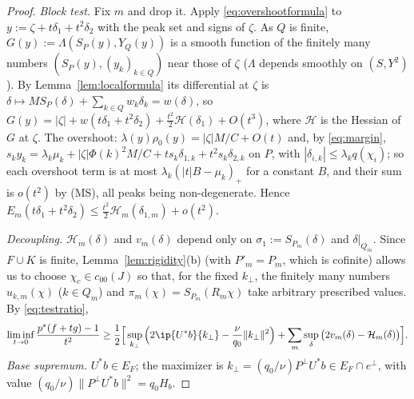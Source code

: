 \begin{proof}
\emph{Block test.}  Fix $m$ and drop it.  Apply \eqref{eq:overshootformula}
to $y:=\zeta+t\delta_1+t^2\delta_2$ with the peak set and signs of $\zeta$.
As $Q$ is finite, $G(y):=\Lambda(S_P(y),Y_Q(y))$ is a smooth function of the
finitely many numbers $(S_P(y),(y_k)_{k\in Q})$ near those of $\zeta$
($\Lambda$ depends smoothly on $(S,Y^2)$).  By Lemma~\ref{lem:localformula}
its differential at $\zeta$ is $\delta\mapsto MS_P(\delta)+\sum_{k\in
Q}w_k\delta_k=w(\delta)$, so
$G(y)=|\zeta|+w(t\delta_1+t^2\delta_2)+\frac{t^2}2\mathcal H(\delta_1)+
O(t^3)$, where $\mathcal H$ is the Hessian of $G$ at $\zeta$.  The overshoot:
$\lambda(y)\rho_0(y)=|\zeta|M/C+O(t)$ and, by \eqref{eq:margin},
$s_ky_k=\lambda_k\mu_k+|\zeta|\Phi(k)^2M/C+ts_k\delta_{1,k}+t^2s_k
\delta_{2,k}$ on $P$, with $|\delta_{i,k}|\le\lambda_kq(\chi_i)$; so each
overshoot term is at most $\lambda_k(|t|B-\mu_k)_+$ for a constant $B$,
and their sum is $o(t^2)$ by (MS), all peaks being non-degenerate.  Hence
$E_m(t\delta_1+t^2\delta_2)\le\frac{t^2}2\mathcal H_m(\delta_{1,m})+o(t^2)$.

\emph{Decoupling.}  $\mathcal H_m(\delta)$ and $v_m(\delta)$ depend only on
$\sigma_1:=S_{P_m}(\delta)$ and $\delta|_{Q_m}$.  Since $F\cup K$ is finite,
Lemma~\ref{lem:rigidity}(b) (with $P'_m=P_m$, which is cofinite) allows us to
choose $\chi_c\in c_{00}(J)$ so that, for the fixed $k_\perp$, the finitely
many numbers $u_{k,m}(\chi)$ ($k\in Q_m$) and $\pi_m(\chi)=S_{P_m}(R_m\chi)$
take arbitrary prescribed values.  By \eqref{eq:testratio},
\[
 \liminf_{t\to0}\frac{p^*(f+tg)-1}{t^2}\ge\frac12\Big[\sup_{k_\perp}
 \Big(2\ip{U^*b}{k_\perp}-\frac{\nu}{q_0}\|k_\perp\|^2\Big)+\sum_m
 \sup_{\delta}\big(2v_m(\delta)-\mathcal H_m(\delta)\big)\Big].
\]
\emph{Base supremum.}  $U^*b\in E_F$; the maximizer is
$k_\perp=(q_0/\nu)P^\perp U^*b\in E_F\cap e^\perp$, with value
$(q_0/\nu)\|P^\perp U^*b\|^2=q_0H_b$.


\end{proof}
